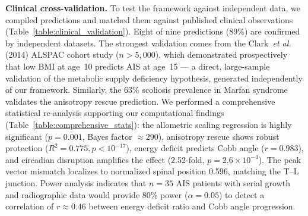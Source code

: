 \documentclass[12pt]{article}
\begin{document}
\textbf{Clinical cross-validation.} To test the framework against independent data, we compiled predictions and matched them against published clinical observations (Table~\ref{table:clinical_validation}). Eight of nine predictions (89\%) are confirmed by independent datasets. The strongest validation comes from the Clark~\textit{et al.} (2014) ALSPAC cohort study ($n > 5{,}000$), which demonstrated prospectively that low BMI at age~10 predicts AIS at age~15 --- a direct, large-sample validation of the metabolic supply deficiency hypothesis, generated independently of our framework. Similarly, the 63\% scoliosis prevalence in Marfan syndrome validates the anisotropy rescue prediction. We performed a comprehensive statistical re-analysis supporting our computational findings (Table~\ref{table:comprehensive_stats}): the allometric scaling regression is highly significant ($p = 0.001$, Bayes factor $\approx 290$), anisotropy rescue shows robust protection ($R^2 = 0.775, p < 10^{-17}$), energy deficit predicts Cobb angle ($r = 0.983$), and circadian disruption amplifies the effect (2.52-fold, $p = 2.6 \times 10^{-4}$). The peak vector mismatch localizes to normalized spinal position 0.596, matching the T--L junction. Power analysis indicates that $n = 35$ AIS patients with serial growth and radiographic data would provide 80\% power ($\alpha = 0.05$) to detect a correlation of $r \approx 0.46$ between energy deficit ratio and Cobb angle progression.
\end{document}
